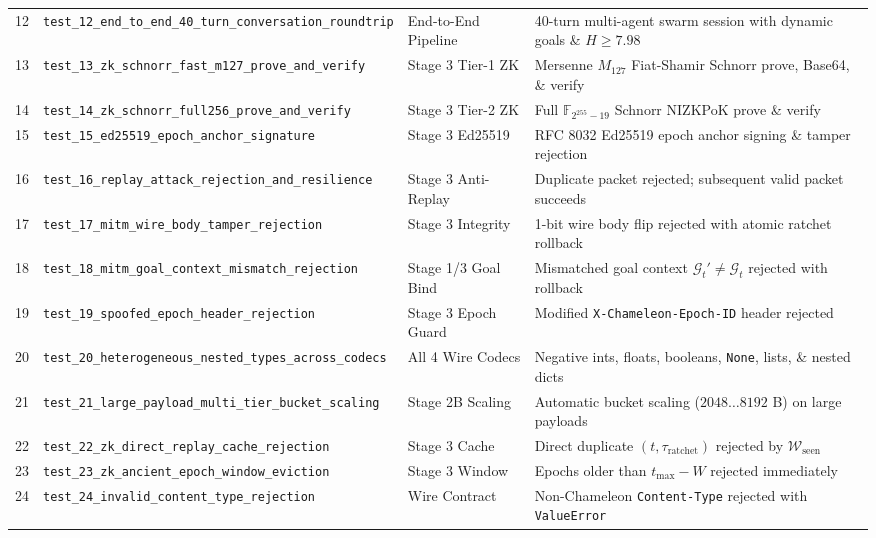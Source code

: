 \documentclass[conference,10pt]{IEEEtran}
\begin{document}
\begin{table}[t!]
{\begin{tabular}{clll}
12 & \texttt{test\_12\_end\_to\_end\_40\_turn\_conversation\_roundtrip} & End-to-End Pipeline & 40-turn multi-agent swarm session with dynamic goals \& $H \ge 7.98$ \\
13 & \texttt{test\_13\_zk\_schnorr\_fast\_m127\_prove\_and\_verify} & Stage 3 Tier-1 ZK & Mersenne $M_{127}$ Fiat-Shamir Schnorr prove, Base64, \& verify \\
14 & \texttt{test\_14\_zk\_schnorr\_full256\_prove\_and\_verify} & Stage 3 Tier-2 ZK & Full $\mathbb{F}_{2^{255}-19}$ Schnorr NIZKPoK prove \& verify \\
15 & \texttt{test\_15\_ed25519\_epoch\_anchor\_signature} & Stage 3 Ed25519 & RFC 8032 Ed25519 epoch anchor signing \& tamper rejection \\
16 & \texttt{test\_16\_replay\_attack\_rejection\_and\_resilience} & Stage 3 Anti-Replay & Duplicate packet rejected; subsequent valid packet succeeds \\
17 & \texttt{test\_17\_mitm\_wire\_body\_tamper\_rejection} & Stage 3 Integrity & 1-bit wire body flip rejected with atomic ratchet rollback \\
18 & \texttt{test\_18\_mitm\_goal\_context\_mismatch\_rejection} & Stage 1/3 Goal Bind & Mismatched goal context $\mathcal{G}_t' \ne \mathcal{G}_t$ rejected with rollback \\
19 & \texttt{test\_19\_spoofed\_epoch\_header\_rejection} & Stage 3 Epoch Guard & Modified \texttt{X-Chameleon-Epoch-ID} header rejected \\
20 & \texttt{test\_20\_heterogeneous\_nested\_types\_across\_codecs} & All 4 Wire Codecs & Negative ints, floats, booleans, \texttt{None}, lists, \& nested dicts \\
21 & \texttt{test\_21\_large\_payload\_multi\_tier\_bucket\_scaling} & Stage 2B Scaling & Automatic bucket scaling ($2048\dots 8192$ B) on large payloads \\
22 & \texttt{test\_22\_zk\_direct\_replay\_cache\_rejection} & Stage 3 Cache & Direct duplicate $(t, \tau_{\text{ratchet}})$ rejected by $\mathcal{W}_{\text{seen}}$ \\
23 & \texttt{test\_23\_zk\_ancient\_epoch\_window\_eviction} & Stage 3 Window & Epochs older than $t_{\max} - W$ rejected immediately \\
24 & \texttt{test\_24\_invalid\_content\_type\_rejection} & Wire Contract & Non-Chameleon \texttt{Content-Type} rejected with \texttt{ValueError} \\
\bottomrule
\end{tabular}%
}
\end{table}
\end{document}
